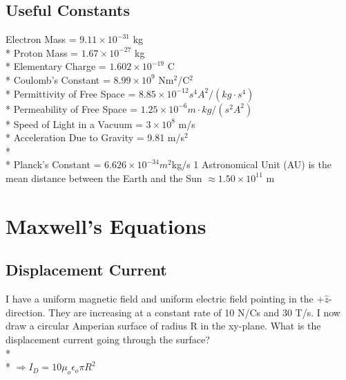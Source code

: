 \documentclass[11pt]{article}
\begin{document}
\maketitle
\tableofcontents
\vspace{50pt}

\subsection*{Useful Constants}
Electron Mass = $9.11 \times 10^{-31}$ kg \\*
Proton Mass = $1.67 \times 10^{-27}$ kg \\*
Elementary Charge = $1.602 \times 10^{-19}$ C \\*
Coulomb's Constant = $8.99 \times 10^9$ Nm$^2$/C$^2$ \\*
Permittivity of Free Space = $8.85 \times 10^{-12} s^4 A^2 / (kg \cdot s^4)$ \\*
Permeability of Free Space = $1.25 \times 10^{-6} m \cdot kg / (s^2 A^2)$ \\*
Speed of Light in a Vacuum = $3 \times 10^8$ m/s \\*
Acceleration Due to Gravity = 9.81 m/s$^2$ \\* \\*
Planck's Constant = $6.626 \times 10^{-34} m^2$kg/s 
1 Astronomical Unit (AU) is the mean distance between the Earth and the Sun $\approx 1.50 \times 10^{11}$ m 


\pagebreak
\section{Maxwell's Equations}
\vspace{10pt}

\subsection{Displacement Current}
I have a uniform magnetic field and uniform electric field pointing in the $+\hat{z}$-direction.  They are increasing at a constant rate of 10 N/Cs and 30 T/s.  I now draw a circular Amperian surface of radius R in the xy-plane.  What is the displacement current going through the surface? \\* \\*
$\Rightarrow I_D = 10 \mu_o \epsilon_o \pi R^2$

\end{document}
